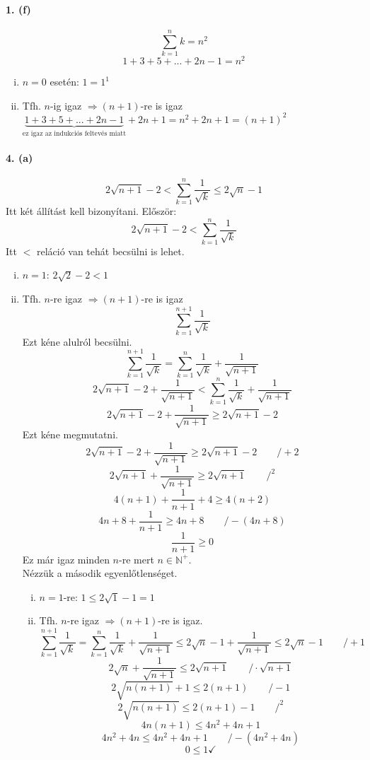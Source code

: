 \documentclass[12pt,a4paper,fleqn]{article}
\newcommand{\myparagraph}[1]{\paragraph{#1}\mbox{}}
\begin{document}
\myparagraph{1. (f)}
\[ \sum_{k=1}^{n} k = n^2 \]
\[ 1+3+5+...+2n-1 = n^2 \]
\begin{enumerate}[i.]
  \item $n=0$ esetén: $1=1^1$ \checkmark
  \item Tfh. $n$-ig igaz $\Rightarrow (n+1)$-re is igaz \\
    $\underbrace{1+3+5+...+2n-1}_{\text{ez igaz az indukciós feltevés miatt}}
    + 2n+1 = n^2 + 2n + 1 = (n+1)^2$ \checkmark
\end{enumerate}


\myparagraph{4. (a)}
\[ 2\sqrt{n+1} - 2 < \sum_{k=1}^{n} \dfrac{1}{\sqrt{k}} \leq 2\sqrt{n}-1 \]
Itt két állítást kell bizonyítani. Először:
\[ 2 \sqrt{n+1} - 2 < \sum_{k=1}^{n} \dfrac{1}{\sqrt{k}} \]
Itt $<$ reláció van tehát becsülni is lehet.
\begin{enumerate}[i.]
  \item $n=1$: $2 \sqrt{2}-2 < 1$ \checkmark
  \item Tfh. $n$-re igaz $\Rightarrow (n+1)$-re is igaz
  \[\sum_{k=1}^{n+1} \dfrac{1}{\sqrt{k}} \]
  Ezt kéne alulról becsülni.
  \[ \sum_{k=1}^{n+1} \dfrac{1}{\sqrt{k}} = \sum_{k=1}^{n} \dfrac{1}{\sqrt{k}} + \dfrac{1}{\sqrt{n+1}} \]
  \[ 2\sqrt{n+1} - 2 + \dfrac{1}{\sqrt{n+1}} < \sum_{k=1}^{n} \dfrac{1}{\sqrt{k}} + \dfrac{1}{\sqrt{n+1}} \]
  \[ 2\sqrt{n+1} - 2 + \dfrac{1}{\sqrt{n+1}} \geq 2\sqrt{n+1} - 2 \]
  Ezt kéne megmutatni.
  \[ 2\sqrt{n+1} - 2 + \dfrac{1}{\sqrt{n+1}} \geq 2\sqrt{n+1} - 2 \qquad /+2 \]
  \[ 2\sqrt{n+1} + \dfrac{1}{\sqrt{n+1}} \geq 2\sqrt{n+1} \qquad /^2 \]
  \[ 4(n+1) + \dfrac{1}{n+1} + 4 \geq 4(n+2) \]
  \[ 4n+8+\dfrac{1}{n+1} \geq 4n+8 \qquad /-(4n+8)\]
  \[ \dfrac{1}{n+1} \geq 0 \]
  Ez már igaz minden $n$-re mert $n \in \mathbb{N}^{+}$. \\
  Nézzük a második egyenlőtlenséget.
  \begin{enumerate}[i.]
    \item $n=1$-re: $1 \leq 2\sqrt{1}-1 = 1$ \checkmark
    \item Tfh. $n$-re igaz $\Rightarrow (n+1)$-re is igaz.
    \[ \sum_{k=1}^{n+1} \dfrac{1}{\sqrt{k}} = \sum_{k=1}^{n} \dfrac{1}{\sqrt{k}}
    + \dfrac{1}{\sqrt{n+1}} \leq 2\sqrt{n}-1 + \dfrac{1}{\sqrt{n+1}} \leq 2\sqrt{n}-1 \qquad /+1 \]
    \[ 2\sqrt{n} + \dfrac{1}{\sqrt{n+1}} \leq 2\sqrt{n+1} \qquad / \cdot \sqrt{n+1} \]
    \[ 2\sqrt{n(n+1)} + 1 \leq 2(n+1) \qquad /-1 \]
    \[ 2\sqrt{n(n+1)} \leq 2(n+1) -1 \qquad /^2 \]
    \[ 4n(n+1) \leq 4n^2+4n+1 \]
    \[ 4n^2+4n \leq 4n^2+4n+1 \qquad /-(4n^2+4n)\]
    \[ 0 \leq 1 \checkmark \]
  \end{enumerate}

\end{enumerate}
\end{document}

